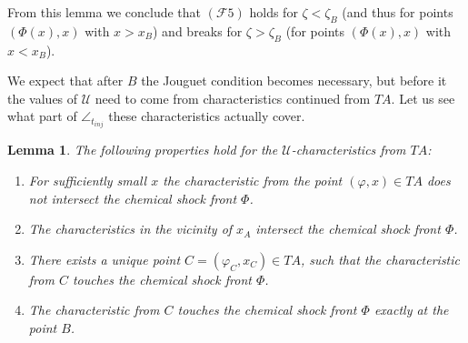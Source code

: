 \documentclass[12pt]{article}
\newtheorem{lemma}{Lemma}
\theoremstyle{definition}
\begin{document}
From this lemma we conclude that $(\mathcal F 5)$ holds for $\zeta < \zeta_B$ (and thus for points $(\Phi(x), x)$ with $x>x_B$) and breaks for $\zeta > \zeta_B$ (for points $(\Phi(x), x)$ with $x<x_B$).

We expect that after $B$ the Jouguet condition becomes necessary, but before it the values of $\mathcal U$ need to come from characteristics continued from $TA$. Let us see what part of $\angle_{t_{inj}}$ these characteristics actually cover.

\begin{lemma}
\label{lemma_in_4_parts}
The following properties hold for the $\mathcal U$-characteristics from $TA$:
\begin{enumerate}
    \item For sufficiently small $x$ the characteristic from the point $(\varphi, x) \in TA$ does not intersect the chemical shock front $\Phi$.
    \item The characteristics in the vicinity of $x_A$ intersect the chemical shock front $\Phi$.
    \item There exists a unique point $C = (\varphi_C, x_C)\in TA$, such that the characteristic from $C$ touches the chemical shock front $\Phi$.
    \item The characteristic from $C$ touches the chemical shock front $\Phi$ exactly at the point $B$.
\end{enumerate}
\end{lemma}
\end{document}
